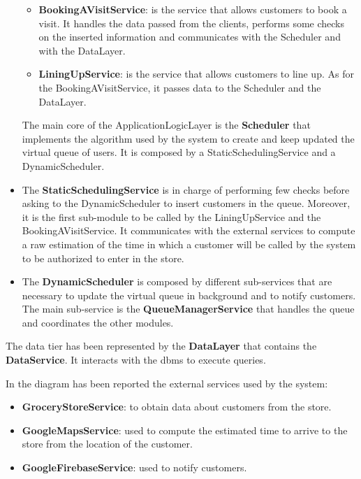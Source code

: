\begin{itemize}
\begin{itemize}
			\item \textbf{BookingAVisitService}: is the service that allows customers to book a visit. It handles the data passed from the clients, performs some checks on the inserted information and communicates with the Scheduler and with the DataLayer.
			\item \textbf{LiningUpService}: is the service that allows customers to line up. As for the BookingAVisitService, it passes data to the Scheduler and the DataLayer.
		\end{itemize}
		
		The main core of the ApplicationLogicLayer is the \textbf{Scheduler} that implements the algorithm used by the system to create and keep updated the virtual queue of users. It is composed by a StaticSchedulingService and a DynamicScheduler.
		\item The \textbf{StaticSchedulingService} is in charge of performing few checks before asking to the DynamicScheduler to insert customers in the queue. Moreover, it is the first sub-module to be called by the LiningUpService and the BookingAVisitService. It communicates with the external services to compute a raw estimation of the time in which a customer will be called by the system to be authorized to enter in the store.
		\item The \textbf{DynamicScheduler} is composed by different sub-services that are necessary to update the virtual queue in background and to notify customers.
		The main sub-service is the \textbf{QueueManagerService} that handles the queue and coordinates the other modules.
\end{itemize}

The data tier has been represented by the \textbf{DataLayer} that contains the \textbf{DataService}. It interacts with the \gls{dbms} to execute queries.

In the diagram has been reported the external services used by the system:
\begin{itemize}
	\item \textbf{GroceryStoreService}: to obtain data about customers from the store.
	\item \textbf{GoogleMapsService}: used to compute the estimated time to arrive to the store from the location of the customer.
	\item \textbf{GoogleFirebaseService}: used to notify customers.
\end{itemize}


